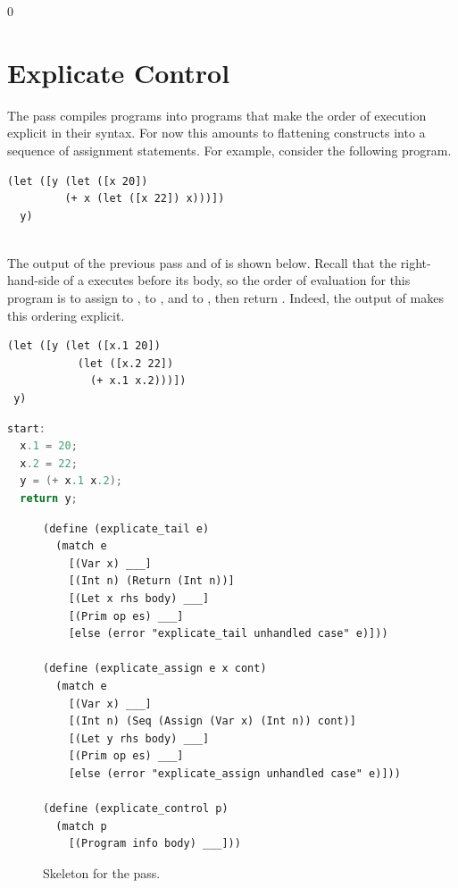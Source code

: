 \documentclass[7x10]{TimesAPriori_MIT}%
\def\racketEd{0}
\def\edition{1}
\begin{document}
{\if\edition\racketEd  
\section{Explicate Control}
\label{sec:explicate-control-Lvar}

The  pass compiles \LangVar{} programs into \LangCVar{}
programs that make the order of execution explicit in their
syntax. For now this amounts to flattening  constructs into a
sequence of assignment statements. For example, consider the following
\LangVar{} program.\\
\begin{minipage}{0.96\textwidth}
\begin{lstlisting}
(let ([y (let ([x 20])
         (+ x (let ([x 22]) x)))])
  y)
\end{lstlisting}
\end{minipage}\\
%
The output of the previous pass and of  is
shown below. Recall that the right-hand-side of a  executes
before its body, so the order of evaluation for this program is to
assign  to ,  to , and
 to , then return . Indeed, the
output of  makes this ordering explicit.
\begin{transformation}
\begin{lstlisting}
(let ([y (let ([x.1 20]) 
           (let ([x.2 22])
             (+ x.1 x.2)))])
 y)
\end{lstlisting}
\compilesto
\begin{lstlisting}[language=C]
start:
  x.1 = 20;
  x.2 = 22;
  y = (+ x.1 x.2);
  return y;
\end{lstlisting}
\end{transformation}

\begin{figure}[tbp]
\begin{lstlisting}
(define (explicate_tail e)
  (match e
    [(Var x) ___]
    [(Int n) (Return (Int n))]
    [(Let x rhs body) ___]
    [(Prim op es) ___]
    [else (error "explicate_tail unhandled case" e)]))

(define (explicate_assign e x cont)
  (match e
    [(Var x) ___]
    [(Int n) (Seq (Assign (Var x) (Int n)) cont)]
    [(Let y rhs body) ___]
    [(Prim op es) ___]
    [else (error "explicate_assign unhandled case" e)]))

(define (explicate_control p)
  (match p
    [(Program info body) ___]))
\end{lstlisting}
\caption{Skeleton for the  pass.}
\label{fig:explicate-control-Lvar}
\end{figure}

}
\end{document}
